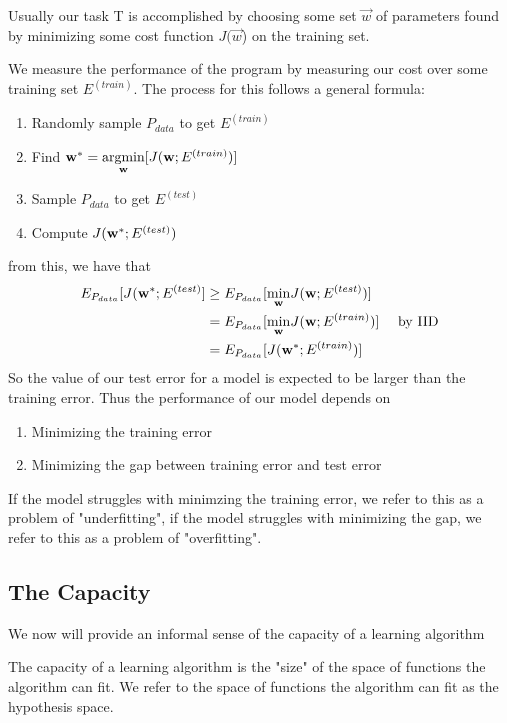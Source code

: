 Usually our task T is accomplished by choosing some set $\overrightarrow{w}$ of parameters found by minimizing some cost function $J(\overrightarrow{w}$) on the training set.

We measure the performance of the program by measuring our cost over some training set $E^{{(train)}}$.
The process for this follows a general formula:
\begin{enumerate}
    \item Randomly sample $P_{data}$ to get $E^{{(train)}}$
    \item Find $\vw^{\ast}=\underset{\vw}{\argmin}[J(\vw;E^{{(train)}})]$
    \item Sample $P_{data}$ to get $E^{{(test)}}$
    \item Compute $J(\vw^{\ast};E^{{(test)}})$
\end{enumerate}
from this, we have that 
\begin{align*}
E_{P_{data}}[J(\vw^{\ast};E^{{(test)}}] &\geq E_{P_{data}}[\underset{\vw}{\min}J(\vw;E^{{(test)}})] \\
&=E_{P_{data}}[\underset{\vw}{\min}J(\vw;E^{{(train)}})] & \text{ by IID}\\
&=E_{P_{data}}[J(\vw^{\ast};E^{{(train)}})]
\end{align*}
So the value of our test error for a model is expected to be larger than the training error. Thus the performance of our model depends on
\begin{enumerate}
    \item Minimizing the training error
    \item Minimizing the gap between training error and test error
\end{enumerate}

If the model struggles with minimzing the training error, we refer to this as a problem of "underfitting", if the model struggles with minimizing the gap, we refer to this as a problem of "overfitting".

\subsection{The Capacity}

We now will provide an informal sense of the capacity of a learning algorithm

\begin{definition}
    The capacity of a learning algorithm is the "size" of the space of functions the algorithm can fit.
    We refer to the space of functions the algorithm can fit as the hypothesis space.
\end{definition}

